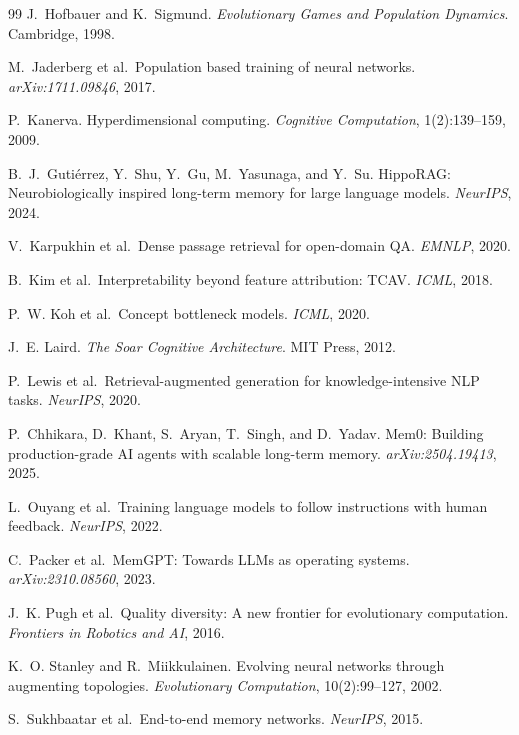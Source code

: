 \documentclass[review]{elsarticle}
\begin{document}
\begin{thebibliography}{99}
J.~Hofbauer and K.~Sigmund. \emph{Evolutionary Games and Population Dynamics}. Cambridge, 1998.

M.~Jaderberg et al.\ Population based training of neural networks. \emph{arXiv:1711.09846}, 2017.

P.~Kanerva. Hyperdimensional computing. \emph{Cognitive Computation}, 1(2):139--159, 2009.

B.~J.~Guti\'{e}rrez, Y.~Shu, Y.~Gu, M.~Yasunaga, and Y.~Su.
HippoRAG: Neurobiologically inspired long-term memory for large language models.
\emph{NeurIPS}, 2024.

V.~Karpukhin et al.\ Dense passage retrieval for open-domain QA. \emph{EMNLP}, 2020.

B.~Kim et al.\ Interpretability beyond feature attribution: TCAV. \emph{ICML}, 2018.

P.~W. Koh et al.\ Concept bottleneck models. \emph{ICML}, 2020.

J.~E. Laird. \emph{The Soar Cognitive Architecture}. MIT Press, 2012.

P.~Lewis et al.\ Retrieval-augmented generation for knowledge-intensive NLP tasks. \emph{NeurIPS}, 2020.

P.~Chhikara, D.~Khant, S.~Aryan, T.~Singh, and D.~Yadav.
Mem0: Building production-grade AI agents with scalable long-term memory.
\emph{arXiv:2504.19413}, 2025.

L.~Ouyang et al.\ Training language models to follow instructions with human feedback. \emph{NeurIPS}, 2022.

C.~Packer et al.\ MemGPT: Towards LLMs as operating systems. \emph{arXiv:2310.08560}, 2023.

J.~K. Pugh et al.\ Quality diversity: A new frontier for evolutionary computation. \emph{Frontiers in Robotics and AI}, 2016.

K.~O. Stanley and R.~Miikkulainen. Evolving neural networks through augmenting topologies. \emph{Evolutionary Computation}, 10(2):99--127, 2002.

S.~Sukhbaatar et al.\ End-to-end memory networks. \emph{NeurIPS}, 2015.


\end{thebibliography}
\end{document}
